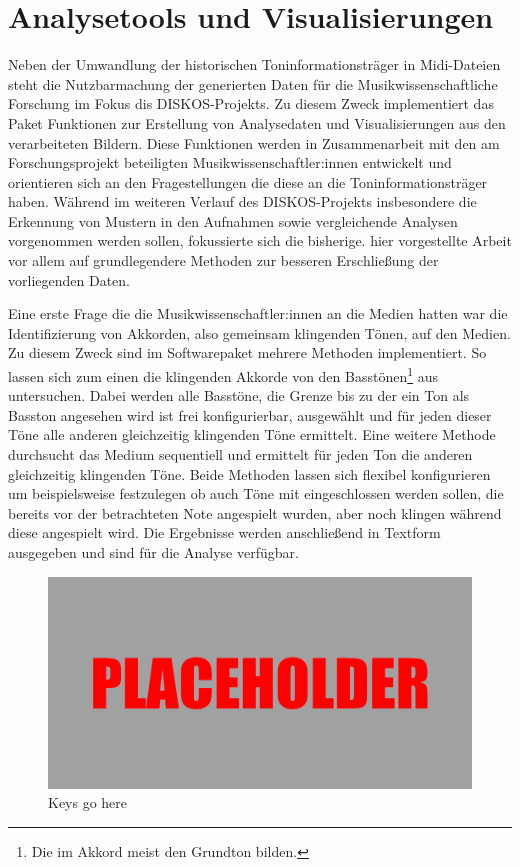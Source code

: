 \FloatBarrier
\section{Analysetools und Visualisierungen}

Neben der Umwandlung der historischen Toninformationsträger in Midi-Dateien steht die Nutzbarmachung der generierten Daten für die Musikwissenschaftliche Forschung im Fokus dis DISKOS-Projekts.
Zu diesem Zweck implementiert das  Paket Funktionen zur Erstellung von Analysedaten und Visualisierungen aus den verarbeiteten Bildern.
Diese Funktionen werden in Zusammenarbeit mit den am Forschungsprojekt beteiligten Musikwissenschaftler:innen entwickelt und orientieren sich an den Fragestellungen die diese an die Toninformationsträger haben.
Während im weiteren Verlauf des DISKOS-Projekts insbesondere die Erkennung von Mustern in den Aufnahmen sowie vergleichende Analysen vorgenommen werden sollen, fokussierte sich die bisherige. hier vorgestellte Arbeit vor allem auf grundlegendere Methoden zur besseren Erschließung der vorliegenden Daten.

Eine erste Frage die die Musikwissenschaftler:innen an die Medien hatten war die Identifizierung von Akkorden, also gemeinsam klingenden Tönen, auf den Medien.
Zu diesem Zweck sind im Softwarepaket mehrere Methoden implementiert.
So lassen sich zum einen die klingenden Akkorde von den Basstönen\footnote{Die im Akkord meist den Grundton bilden.} aus untersuchen.
Dabei werden alle Basstöne, die Grenze bis zu der ein Ton als Basston angesehen wird ist frei konfigurierbar, ausgewählt und für jeden dieser Töne alle anderen gleichzeitig klingenden Töne ermittelt.
Eine weitere Methode durchsucht das Medium sequentiell und ermittelt für jeden Ton die anderen gleichzeitig klingenden Töne.
Beide Methoden lassen sich flexibel konfigurieren um beispielsweise festzulegen ob auch Töne mit eingeschlossen werden sollen, die bereits vor der betrachteten Note angespielt wurden, aber noch klingen während diese angespielt wird.
Die Ergebnisse werden anschließend in Textform ausgegeben und sind für die Analyse verfügbar.

\begin{figure}[t]
    \centering
    \includegraphics[width=\textwidth]{graphics/placeholder.png}
    \caption{Keys go here}
    \label{keys}
\end{figure}

